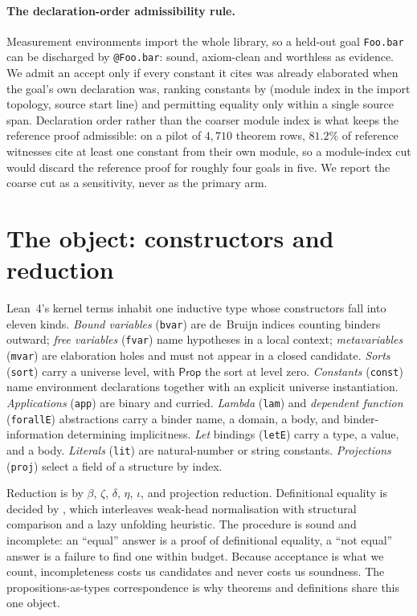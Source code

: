 \paragraph{The declaration-order admissibility rule.}
Measurement environments import the whole library, so a held-out goal
\texttt{Foo.bar} can be discharged by \texttt{@Foo.bar}:
sound, axiom-clean and worthless as evidence.
We admit an accept only if every constant it cites was already elaborated when
the goal's own declaration was, ranking constants by (module index in the import
topology, source start line) and permitting equality only within a single source
span.
Declaration order rather than the coarser module index is what keeps the
reference proof admissible:
on a pilot of \(4{,}710\) theorem rows, \(81.2\%\) of reference witnesses cite at
least one constant from their own module, so a module-index cut would discard
the reference proof for roughly four goals in five.
We report the coarse cut as a sensitivity, never as the primary arm.

\section{The object: constructors and reduction}
\label{app:expr}

Lean~4's kernel terms inhabit one inductive type whose constructors fall into
eleven kinds.
\emph{Bound variables} (\texttt{bvar}) are de~Bruijn indices counting binders
outward;
\emph{free variables} (\texttt{fvar}) name hypotheses in a local context;
\emph{metavariables} (\texttt{mvar}) are elaboration holes and must not appear in
a closed candidate.
\emph{Sorts} (\texttt{sort}) carry a universe level, with \(\mathsf{Prop}\) the
sort at level zero.
\emph{Constants} (\texttt{const}) name environment declarations together with an
explicit universe instantiation.
\emph{Applications} (\texttt{app}) are binary and curried.
\emph{Lambda} (\texttt{lam}) and \emph{dependent function} (\texttt{forallE})
abstractions carry a binder name, a domain, a body, and binder-information
determining implicitness.
\emph{Let} bindings (\texttt{letE}) carry a type, a value, and a body.
\emph{Literals} (\texttt{lit}) are natural-number or string constants.
\emph{Projections} (\texttt{proj}) select a field of a structure by index.

Reduction is by \(\beta\), \(\zeta\), \(\delta\), \(\eta\), \(\iota\), and
projection reduction.
Definitional equality is decided by \isDefEq, which interleaves weak-head
normalisation with structural comparison and a lazy unfolding heuristic.
The procedure is sound and incomplete:
an ``equal'' answer is a proof of definitional equality, a ``not equal'' answer
is a failure to find one within budget.
Because acceptance is what we count, incompleteness costs us candidates and
never costs us soundness.
The propositions-as-types correspondence \citep{curry1934functionality,
Howard1980} is why theorems and definitions share this one object.

